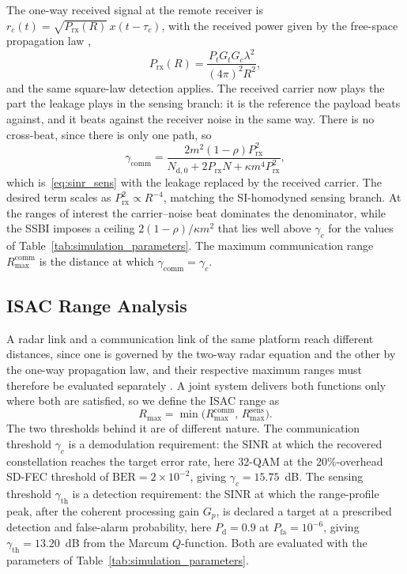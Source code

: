 \documentclass[10pt,journal,comsoc]{IEEEtran}
\begin{document}
The one-way received signal at the remote receiver is
$r_c(t)=\sqrt{P_{\mathrm{rx}}(R)}\,x(t-\tau_c)$, with the received
power given by the free-space propagation law \cite{skolnik_introduction_1980},
\begin{equation}
P_{\mathrm{rx}}(R)=\frac{P_tG_tG_c\lambda^2}{(4\pi)^2R^2},
\label{eq:prx}
\end{equation}
and the same square-law detection applies. The received carrier now
plays the part the leakage plays in the sensing branch: it is the
reference the payload beats against, and it beats against the receiver
noise in the same way. There is no cross-beat, since there is only one
path, so
\begin{equation}
\gamma_{\mathrm{comm}}
=\frac{2m^2(1-\rho)P_{\mathrm{rx}}^2}
{N_{\mathrm{d},0}+2P_{\mathrm{rx}}N+\kappa m^4P_{\mathrm{rx}}^2},
\label{eq:sinr_comm}
\end{equation}
which is~\eqref{eq:sinr_sens} with the leakage replaced by the received
carrier. The desired term scales as $P_{\mathrm{rx}}^2\propto R^{-4}$,
matching the SI-homodyned sensing branch. At the ranges of interest the
carrier--noise beat dominates the denominator, while the SSBI imposes a
ceiling $2(1-\rho)/\kappa m^2$ that lies well above $\gamma_c$ for the
values of Table~\ref{tab:simulation_parameters}. The maximum
communication range $R_{\max}^{\mathrm{comm}}$ is the distance at which
$\gamma_{\mathrm{comm}}=\gamma_c$.

\subsection{ISAC Range Analysis}
\label{sec:isac_range}

A radar link and a communication link of the same platform reach
different distances, since one is governed by the two-way radar
equation and the other by the one-way propagation law, and their
respective maximum ranges must therefore be evaluated separately
\cite{sturm_waveform_2011}. A joint system delivers both functions
only where both are satisfied, so we define the ISAC range as
\begin{equation}
R_{\max}=\min\big(R_{\max}^{\mathrm{comm}},\,
R_{\max}^{\mathrm{sens}}\big).
\label{eq:rmax}
\end{equation}
The two thresholds behind it are of different nature. The
communication threshold $\gamma_c$ is a demodulation requirement: the
SINR at which the recovered constellation reaches the target error
rate, here $32$-QAM at the $20\%$-overhead SD-FEC threshold of
$\mathrm{BER}=2\times10^{-2}$, giving $\gamma_c=15.75$~dB. The sensing
threshold $\gamma_{\mathrm{th}}$ is a detection requirement: the SINR
at which the range-profile peak, after the coherent processing gain
$G_p$, is declared a target at a prescribed detection and false-alarm
probability, here $P_{\mathrm{d}}=0.9$ at $P_{\mathrm{fa}}=10^{-6}$,
giving $\gamma_{\mathrm{th}}=13.20$~dB from the Marcum
$Q$-function. Both are evaluated with the parameters of
Table~\ref{tab:simulation_parameters}.
\end{document}
